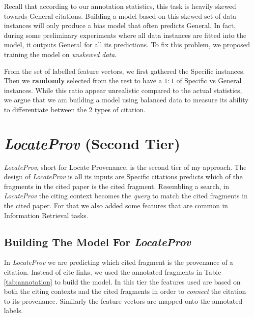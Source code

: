 Recall that according to our annotation statistics, this task is heavily skewed towards General citations. Building a model based on this skewed set of data instances will only produce a bias model that often predicts General. In fact, during some preliminary experiments where all data instances are fitted into the model, it outputs General for all its predictions. To fix this problem, we proposed training the model on {\it unskewed data}.

From the set of labelled feature vectors, we first gathered the Specific instances. Then we {\bf randomly} selected from the rest to have a $1:1$ of Specific vs General instances. While this ratio appear unrealistic compared to the actual statistics, we argue that we am building a model using balanced data to measure its ability to differentiate between the 2 types of citation.

\section{{\it LocateProv} (Second Tier)}
\label{secondtier}
{\it LocateProv}, short for Locate Provenance, is the second tier of my approach. The design of {\it LocateProv} is all its inputs are Specific citations predicts which of the fragments in the cited paper is the cited fragment. Resembling a search, in {\it LocateProv} the citing context becomes the {\it query} to match the cited fragments in the cited paper. For that we also added some features that are common in Information Retrieval tasks.

\subsection*{Building The Model For {\it LocateProv}}
In {\it LocateProv} we are predicting which cited fragment is the provenance of a citation. Instead of cite links, we used the annotated fragments in Table \ref{tab:annotation} to build the model. In this tier the features used are based on both the citing contexts and the cited fragments in order to {\it connect} the citation to its provenance. Similarly the feature vectors are mapped onto the annotated labels.

